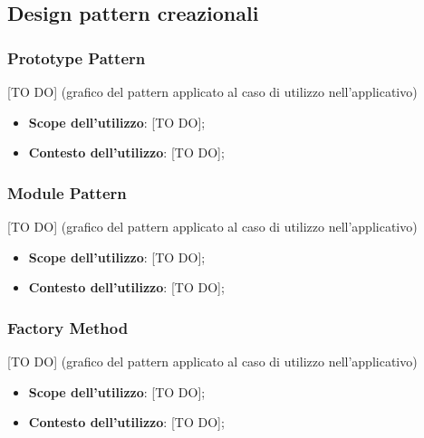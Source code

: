 %


\subsection{Design pattern creazionali} %
\label{sub:design_pattern_creazionali}
	\subsubsection{Prototype Pattern} %
	\label{ssub:prototype_pattern}
	[TO DO] (grafico del pattern applicato al caso di utilizzo nell'applicativo)
		\begin{itemize}
			\item \textbf{Scope dell'utilizzo}: [TO DO];
			\item \textbf{Contesto dell'utilizzo}: [TO DO];
		\end{itemize}

	\subsubsection{Module Pattern} %
	\label{ssub:module_pattern}
	[TO DO] (grafico del pattern applicato al caso di utilizzo nell'applicativo)
		\begin{itemize}
			\item \textbf{Scope dell'utilizzo}: [TO DO];
			\item \textbf{Contesto dell'utilizzo}: [TO DO];
		\end{itemize}

	\subsubsection{Factory Method} %
	\label{ssub:factory_method}
	[TO DO] (grafico del pattern applicato al caso di utilizzo nell'applicativo)
		\begin{itemize}
			\item \textbf{Scope dell'utilizzo}: [TO DO];
			\item \textbf{Contesto dell'utilizzo}: [TO DO];
		\end{itemize}


